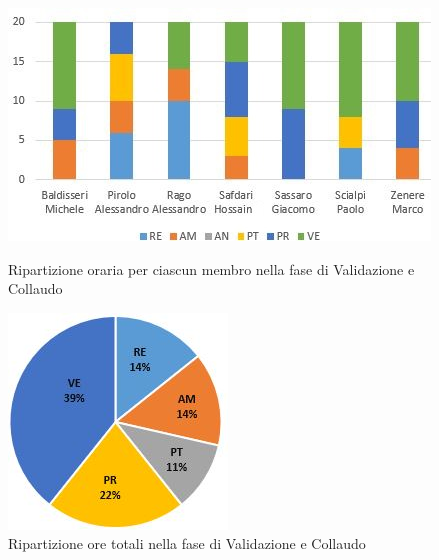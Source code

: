 \begin{figure}[!htb]
   \begin{minipage}{0.6\textwidth}
     \centering
     \includegraphics{Images/PO-Verifica}
     \caption{Ripartizione oraria per ciascun membro nella fase di Validazione e Collaudo}
   \end{minipage}\hspace{0.1\textwidth}
   \begin{minipage}{0.3\textwidth}
     \centering
     \includegraphics[width=.9\textwidth]{Images/PE-Verifica}
     \captionsetup{width=.9\textwidth}
     \caption{Ripartizione ore totali nella fase di Validazione e Collaudo}
   \end{minipage}
\end{figure}